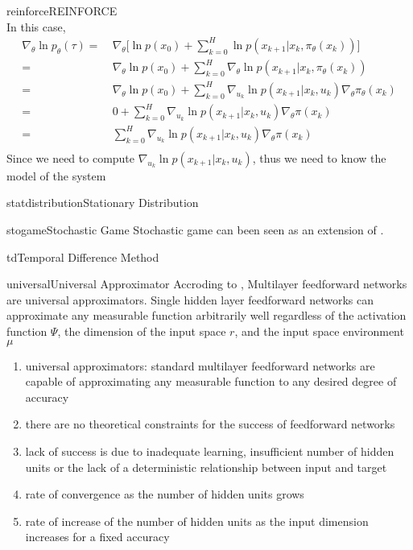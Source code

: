 \documentclass[9pt]{article}
\begin{document}
\begin{topic}{reinforce}{REINFORCE}
\[\]
In this case, 
\[
\begin{split}
\nabla_{\theta} \ln p_{\theta}(\tau) = &\ \nabla_{\theta} \big[ \ln p(x_0) + \sum_{k=0}^{H} \ln p(x_{k+1}|x_k,\pi_{\theta}(x_k))\big]\\
= &\ \nabla_{\theta} \ln p(x_0) + \sum_{k=0}^{H} \nabla_{\theta} \ln p(x_{k+1}|x_k,\pi_{\theta}(x_k))\\
= &\ \nabla_{\theta} \ln p(x_0) + \sum_{k=0}^{H} \nabla_{u_k} \ln p(x_{k+1}|x_k,u_k) \nabla_{\theta} \pi_{\theta}(x_k)\\
= &\ 0 +  \sum_{k=0}^{H} \nabla_{u_k} \ln p(x_{k+1}|x_k,u_k) \nabla_{\theta} \pi(x_k)\\
= &\ \sum_{k=0}^{H} \nabla_{u_k} \ln p(x_{k+1}|x_k,u_k) \nabla_{\theta} \pi(x_k)\\
\end{split}
\]
Since we need to compute $\nabla_{u_k} \ln p(x_{k+1}|x_k,u_k)$, thus we need to know the model of the system
\end{topic}


\begin{topic}{statdistribution}{Stationary Distribution}
\Working
\end{topic}

\begin{topic}{stogame}{Stochastic Game}
Stochastic game can been seen as an extension of .
\end{topic}

\begin{topic}{td}{Temporal Difference Method} 
\end{topic}

\begin{topic}{universal}{Universal Approximator} 
Accroding to \citep{hornik1989multilayer}, Multilayer feedforward networks are universal approximators. Single hidden layer  feedforward networks can approximate any measurable function arbitrarily well regardless of the activation function $\Psi$, the dimension of the input space $r$, and the input space environment $\mu$
\begin{enumerate}
\item universal approximators: standard multilayer feedforward networks are capable of approximating
any measurable function to any desired degree of accuracy
\item there are no theoretical constraints for the success of
feedforward networks
\item lack of success is due to inadequate learning, insufficient number of hidden units or the lack of a deterministic relationship between input and target
\item rate of convergence as the number of hidden units grows
\item rate of increase of the number of hidden units as the input dimension increases for a fixed accuracy
\end{enumerate}
\end{topic}
\end{document}
